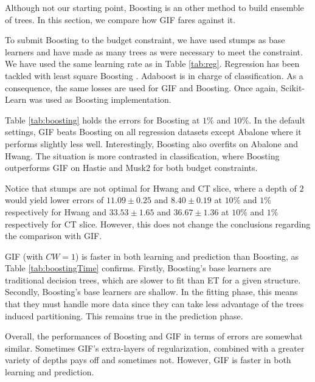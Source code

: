 \documentclass{article}
\begin{document}
Although not our starting point, Boosting is an other method to build ensemble 
of trees. In this section, we compare how GIF fares against it. 

To submit Boosting to the budget constraint, we have used stumps as base 
learners and have made as many trees as were necessary to meet the constraint. 
We have used the same learning rate as in Table \ref{tab:reg}. Regression has 
been tackled with least square Boosting \cite{hastie2009}.
Adaboost \cite{adaboost} is in charge of classification. As a consequence, the 
same losses are used for GIF and Boosting. Once again, Scikit-Learn was used as 
Boosting implementation.


Table \ref{tab:boosting} holds the errors for Boosting at $1\%$ and $10\%$. In 
the default settings, GIF beats Boosting on all regression datasets except 
Abalone where it performs slightly less well. Interestingly, Boosting also 
overfits on Abalone and Hwang. The situation is more contrasted in 
classification, where Boosting outperforms GIF on Hastie and Musk2 for both 
budget constraints.

Notice that stumps are not optimal for Hwang and CT slice, where a depth of $2$ 
would yield lower errors of $11.09 \pm 0.25$ and $8.40 \pm 0.19$ at $10\%$ and 
$1\%$ respectively for Hwang and $33.53 \pm 1.65$ and $36.67 \pm 1.36$ at 
$10\%$ and $1\%$ respectively for CT slice. However, this does not change the 
conclusions regarding the comparison with GIF.

GIF (with $CW=1$) is faster in both learning and prediction than Boosting, as 
Table \ref{tab:boostingTime} confirms. Firstly, Boosting's base learners are 
traditional decision trees, which are slower to fit than ET for a given 
structure. Secondly, Boosting's base learners are shallow. In the fitting 
phase, this means that they must handle more data since they can take less 
advantage of the trees induced partitioning. This remains true in the 
prediction phase.

Overall, the performances of Boosting and GIF in terms of errors are somewhat 
similar. Sometimes GIF's extra-layers of regularization, combined with a 
greater variety of depths pays off and sometimes not. However, GIF is faster in 
both learning and prediction.
\end{document}
